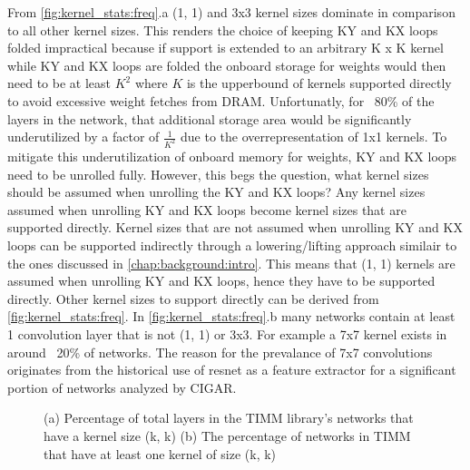 From \autoref{fig:kernel_stats:freq}.a (1, 1) and 3x3 kernel sizes dominate in
comparison to all other kernel sizes. This renders the choice of keeping KY and
KX loops folded impractical because if support is extended to an arbitrary K x K
kernel while KY and KX loops are folded the onboard storage for weights would
then need to be at least $K^2$ where $K$ is the upperbound of kernels supported
directly to avoid excessive weight fetches from DRAM. Unfortunatly, for ~80\% of
the layers in the network, that additional storage area would be significantly
underutilized by a factor of $\frac{1}{K^2}$ due to the overrepresentation of
1x1 kernels. To mitigate this underutilization of onboard memory for weights, KY
and KX loops need to be unrolled fully. However, this begs the question, what
kernel sizes should be assumed when unrolling the KY and KX loops? Any kernel
sizes assumed when unrolling KY and KX loops become kernel sizes that are
supported directly. Kernel sizes that are not assumed when unrolling KY and KX
loops can be supported indirectly through a lowering/lifting approach similair
to the ones discussed in \autoref{chap:background:intro}. This means that (1, 1)
kernels are assumed when unrolling KY and KX loops, hence they have to be
supported directly. Other kernel sizes to support directly can be derived from
\autoref{fig:kernel_stats:freq}. In \autoref{fig:kernel_stats:freq}.b many
networks contain at least 1 convolution layer that is not (1, 1) or 3x3. For
example a 7x7 kernel exists in around ~20\% of networks. The reason for the
prevalance of 7x7 convolutions originates from the historical use of resnet
\cite{resnet} as a feature extractor for a significant portion of networks
analyzed by CIGAR.

\clearpage
\begin{figure}
    \centering
    \caption{(a) Percentage of total layers in the TIMM library's networks that have a kernel size (k, k) (b) The percentage of networks in TIMM that have at least one kernel of size (k, k)}
    \label{fig:kernel_stats:freq}
\end{figure}


